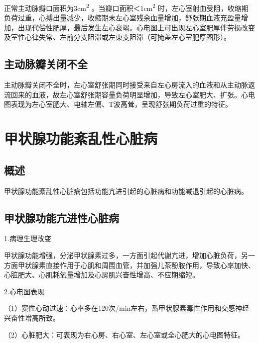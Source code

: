 正常主动脉瓣口面积为3cm\textsuperscript{2}
。当瓣口面积＜1cm\textsuperscript{2}
时，左心室射血受阻，收缩期负荷过重，心搏出量减少，收缩期末左心室残余血量增加，舒张期血液充盈量增加，出现代偿性肥厚，最后发生左心衰竭。心电图上可出现左心室肥厚伴劳损改变及室性心律失常、左前分支阻滞或左束支阻滞（可掩盖左心室肥厚图形）。

\protect\hypertarget{text00050.htmlux5cux23subid604}{}{}

\subsection{主动脉瓣关闭不全}

主动脉瓣关闭不全时，左心室舒张期同时接受来自左心房流入的血液和从主动脉返流回来的血液，故左心室舒张期容量负荷明显增加，导致左心室肥大、扩张。心电图表现为左心室肥大、电轴左偏、T波高耸，呈现舒张期负荷过重的特征。

\protect\hypertarget{text00050.htmlux5cux23subid605}{}{}

\section{甲状腺功能紊乱性心脏病}

\protect\hypertarget{text00050.htmlux5cux23subid606}{}{}

\subsection{概述}

甲状腺功能紊乱性心脏病包括功能亢进引起的心脏病和功能减退引起的心脏病。

\protect\hypertarget{text00050.htmlux5cux23subid607}{}{}

\subsection{甲状腺功能亢进性心脏病}

1.病理生理改变

甲状腺功能增强，分泌甲状腺素过多，一方面引起代谢亢进，增加心脏负荷，另一方面甲状腺素直接作用于心肌和周围血管，并加强儿茶酚胺作用，导致心率加快、心脏肥大、心肌耗氧量增加及心房肌兴奋性增高、不应期缩短。

2.心电图表现

（1）窦性心动过速：心率多在120次/min左右，系甲状腺素毒性作用和交感神经兴奋性增高所致。

（2）心脏肥大：可表现为右心房、右心室、左心室或全心肥大的心电图特征。

